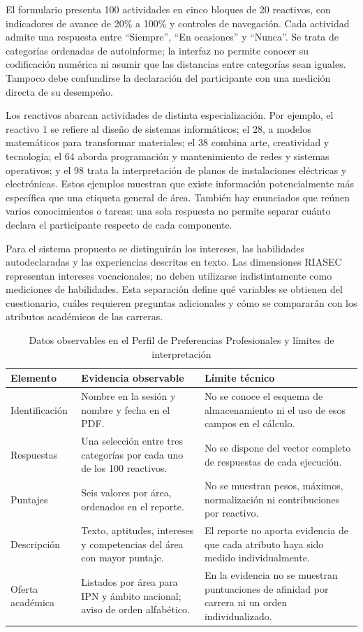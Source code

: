El formulario presenta 100 actividades en cinco bloques de 20 reactivos, con indicadores de avance de 20\% a 100\% y controles de navegación. Cada actividad admite una respuesta entre ``Siempre'', ``En ocasiones'' y ``Nunca''. Se trata de categorías ordenadas de autoinforme; la interfaz no permite conocer su codificación numérica ni asumir que las distancias entre categorías sean iguales. Tampoco debe confundirse la declaración del participante con una medición directa de su desempeño.

Los reactivos abarcan actividades de distinta especialización. Por ejemplo, el reactivo 1 se refiere al diseño de sistemas informáticos; el 28, a modelos matemáticos para transformar materiales; el 38 combina arte, creatividad y tecnología; el 64 aborda programación y mantenimiento de redes y sistemas operativos; y el 98 trata la interpretación de planos de instalaciones eléctricas y electrónicas. Estos ejemplos muestran que existe información potencialmente más específica que una etiqueta general de área. También hay enunciados que reúnen varios conocimientos o tareas: una sola respuesta no permite separar cuánto declara el participante respecto de cada componente.

Para el sistema propuesto se distinguirán los intereses, las habilidades autodeclaradas y las experiencias descritas en texto. Las dimensiones RIASEC representan intereses vocacionales; no deben utilizarse indistintamente como mediciones de habilidades. Esta separación define qué variables se obtienen del cuestionario, cuáles requieren preguntas adicionales y cómo se compararán con los atributos académicos de las carreras.

\begin{table}[htbp]
\centering
\small
\caption{Datos observables en el Perfil de Preferencias Profesionales y límites de interpretación}
\label{tab:datos-ppp}
\begin{tabularx}{\textwidth}{L{0.22\textwidth}XX}
\toprule
\textbf{Elemento} & \textbf{Evidencia observable} & \textbf{Límite técnico} \\
\midrule
Identificación & Nombre en la sesión y nombre y fecha en el PDF. & No se conoce el esquema de almacenamiento ni el uso de esos campos en el cálculo. \\
Respuestas & Una selección entre tres categorías por cada uno de los 100 reactivos. & No se dispone del vector completo de respuestas de cada ejecución. \\
Puntajes & Seis valores por área, ordenados en el reporte. & No se muestran pesos, máximos, normalización ni contribuciones por reactivo. \\
Descripción & Texto, aptitudes, intereses y competencias del área con mayor puntaje. & El reporte no aporta evidencia de que cada atributo haya sido medido individualmente. \\
Oferta académica & Listados por área para IPN y ámbito nacional; aviso de orden alfabético. & En la evidencia no se muestran puntuaciones de afinidad por carrera ni un orden individualizado. \\
\bottomrule
\end{tabularx}
\end{table}

